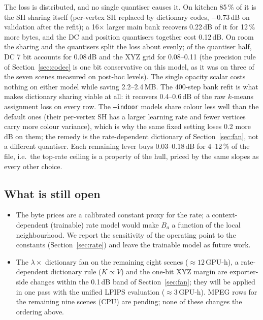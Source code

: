 \documentclass[11pt,a4paper]{article}
\begin{document}
The loss is distributed, and no single quantiser causes it. On kitchen 85\,\% of it is the SH sharing itself (per-vertex SH replaced by dictionary codes, $-0.73$\,dB on validation after the refit); a 16$\times$ larger main bank recovers 0.22\,dB of it for 12\,\% more bytes, and the DC and position quantisers together cost 0.12\,dB. On room the sharing and the quantisers split the loss about evenly; of the quantiser half, DC 7 bit accounts for 0.08\,dB and the XYZ grid for 0.08--0.11 (the precision rule of Section~\ref{sec:codec} is one bit conservative on this model, as it was on three of the seven scenes measured on post-hoc levels). The single opacity scalar costs nothing on either model while saving 2.2--2.4\,MB. The 400-step bank refit is what makes dictionary sharing viable at all: it recovers 0.4--0.6\,dB of the raw $k$-means assignment loss on every row. The \texttt{--indoor} models share colour less well than the default ones (their per-vertex SH has a larger learning rate and fewer vertices carry more colour variance), which is why the same fixed setting loses 0.2 more dB on them; the remedy is the rate-dependent dictionary of Section~\ref{sec:fan}, not a different quantiser. Each remaining lever buys 0.03--0.18\,dB for 4--12\,\% of the file, i.e.\ the top-rate ceiling is a property of the hull, priced by the same slopes as every other choice.

\subsection{What is still open}
\begin{itemize}[nosep,leftmargin=*]
  \item The byte prices are a calibrated constant proxy for the rate; a context-dependent (trainable) rate model would make $B_a$ a function of the local neighbourhood. We report the sensitivity of the operating point to the constants (Section~\ref{sec:rate}) and leave the trainable model as future work.
  \item The $\lambda \times$ dictionary fan on the remaining eight scenes ($\approx 12$\,GPU-h), a rate-dependent dictionary rule ($K \propto V$) and the one-bit XYZ margin are exporter-side changes within the 0.1\,dB band of Section~\ref{sec:fan}; they will be applied in one pass with the unified LPIPS evaluation ($\approx 3$\,GPU-h). MPEG rows for the remaining nine scenes (CPU) are pending; none of these changes the ordering above.
\end{itemize}
\end{document}
